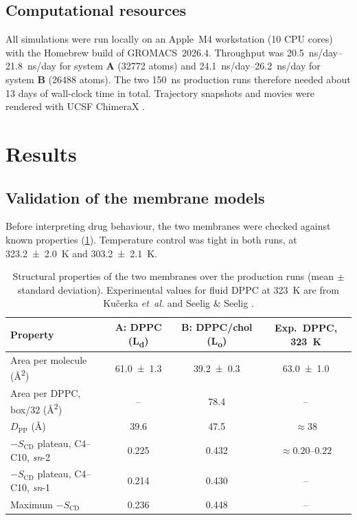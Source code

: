 \documentclass[11pt,a4paper]{article}
\newcommand{\scd}{S_{\mathrm{CD}}}
\newcommand{\sysA}{\textcolor{sysA}{\textbf{A}}}
\newcommand{\sysB}{\textcolor{sysB}{\textbf{B}}}
\newcommand{\Ld}{L\textsubscript{d}}
\newcommand{\Lo}{L\textsubscript{o}}
\begin{document}
\subsection{Computational resources}
All simulations were run locally on an Apple~M4 workstation (10 CPU cores) with the Homebrew build of
GROMACS~2026.4. Throughput was \SIrange{20.5}{21.8}{ns/day} for system \sysA{} (\num{32772} atoms) and
\SIrange{24.1}{26.2}{ns/day} for system \sysB{} (\num{26488} atoms). The two \SI{150}{ns} production
runs therefore needed about 13 days of wall-clock time in total. Trajectory snapshots and movies were
rendered with UCSF ChimeraX \cite{pettersen2021}.

\section{Results}
\label{sec:results}

\subsection{Validation of the membrane models}
Before interpreting drug behaviour, the two membranes were checked against known properties
(\cref{tab:membrane}). Temperature control was tight in both runs, at \SI{323.2 \pm 2.0}{K} and
\SI{303.2 \pm 2.1}{K}.

\begin{table}[!htbp]
\centering
\caption[Structural properties of the bilayers]{Structural properties of the two membranes over the
production runs (mean $\pm$ standard deviation). Experimental values for fluid DPPC at
\SI{323}{K} are from Ku\v{c}erka \emph{et~al.} \cite{kucerka2011} and Seelig \& Seelig \cite{seelig1974}.}
\label{tab:membrane}
\begin{tabular}{@{}lccc@{}}
\toprule
Property & \sysA: DPPC (\Ld) & \sysB: DPPC/chol (\Lo) & Exp.\ DPPC, \SI{323}{K} \\
\midrule
Area per molecule (\si{\angstrom^2}) & \num{61.0 \pm 1.3} & \num{39.2 \pm 0.3} & \num{63.0 \pm 1.0} \\
Area per DPPC, box/32 (\si{\angstrom^2}) & -- & \num{78.4} & -- \\
$D_\mathrm{PP}$ (\si{\angstrom}) & \num{39.6} & \num{47.5} & $\approx 38$ \\
$-\scd$ plateau, C4--C10, \emph{sn}-2 & \num{0.225} & \num{0.432} & $\approx 0.20$--$0.22$ \\
$-\scd$ plateau, C4--C10, \emph{sn}-1 & \num{0.214} & \num{0.430} & -- \\
Maximum $-\scd$ & \num{0.236} & \num{0.448} & -- \\
\bottomrule
\end{tabular}
\end{table}
\end{document}
